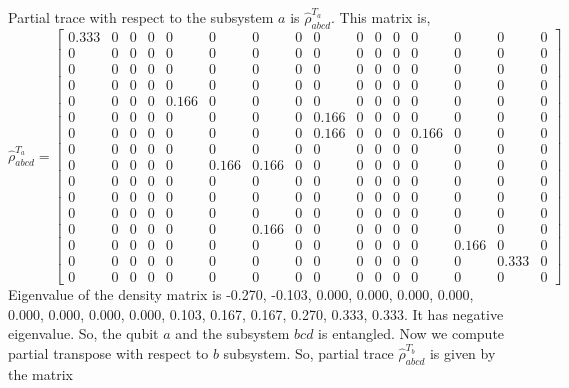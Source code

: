 \documentclass{amsart}
\theoremstyle{plain}
\theoremstyle{definition}
\theoremstyle{plain}
\begin{document}
Partial trace with respect to the subsystem $a$ is $\hat{\rho}^{T_a}_{abcd}$. This matrix is, 
\begin{equation*}
	\hat{\rho}^{T_a}_{abcd} = \left[\begin{array}{cccccccccccccccc}0.333 & 0 & 0 & 0 & 0 & 0 & 0 & 0 & 0 & 0 & 0 & 0 & 0 & 0 & 0 & 0\\0 & 0 & 0 & 0 & 0 & 0 & 0 & 0 & 0 & 0 & 0 & 0 & 0 & 0 & 0 & 0\\0 & 0 & 0 & 0 & 0 & 0 & 0 & 0 & 0 & 0 & 0 & 0 & 0 & 0 & 0 & 0\\0 & 0 & 0 & 0 & 0 & 0 & 0 & 0 & 0 & 0 & 0 & 0 & 0 & 0 & 0 & 0\\0 & 0 & 0 & 0 & 0.166 & 0 & 0 & 0 & 0 & 0 & 0 & 0 & 0 & 0 & 0 & 0\\0 & 0 & 0 & 0 & 0 & 0 & 0 & 0 & 0.166 & 0 & 0 & 0 & 0 & 0 & 0 & 0\\0 & 0 & 0 & 0 & 0 & 0 & 0 & 0 & 0.166 & 0 & 0 & 0 & 0.166 & 0 & 0 & 0\\0 & 0 & 0 & 0 & 0 & 0 & 0 & 0 & 0 & 0 & 0 & 0 & 0 & 0 & 0 & 0\\0 & 0 & 0 & 0 & 0 & 0.166 & 0.166 & 0 & 0 & 0 & 0 & 0 & 0 & 0 & 0 & 0\\0 & 0 & 0 & 0 & 0 & 0 & 0 & 0 & 0 & 0 & 0 & 0 & 0 & 0 & 0 & 0\\0 & 0 & 0 & 0 & 0 & 0 & 0 & 0 & 0 & 0 & 0 & 0 & 0 & 0 & 0 & 0\\0 & 0 & 0 & 0 & 0 & 0 & 0 & 0 & 0 & 0 & 0 & 0 & 0 & 0 & 0 & 0\\0 & 0 & 0 & 0 & 0 & 0 & 0.166 & 0 & 0 & 0 & 0 & 0 & 0 & 0 & 0 & 0\\0 & 0 & 0 & 0 & 0 & 0 & 0 & 0 & 0 & 0 & 0 & 0 & 0 & 0.166 & 0 & 0\\0 & 0 & 0 & 0 & 0 & 0 & 0 & 0 & 0 & 0 & 0 & 0 & 0 & 0 & 0.333 & 0\\0 & 0 & 0 & 0 & 0 & 0 & 0 & 0 & 0 & 0 & 0 & 0 & 0 & 0 & 0 & 0\end{array}\right]
\end{equation*}
Eigenvalue of the density matrix is -0.270, -0.103, 0.000, 0.000, 0.000, 0.000, 0.000, 0.000, 0.000, 0.000, 0.103, 0.167, 0.167, 0.270, 0.333, 0.333. It has negative eigenvalue. So, the qubit $a$ and the subsystem $bcd$ is entangled. Now we compute partial transpose with respect to $b$ subsystem. So, partial trace $\hat{\rho}^{T_b}_{abcd}$ is given by the matrix
\end{document}
